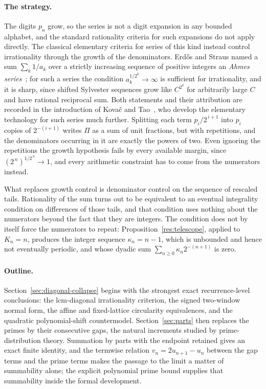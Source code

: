 \documentclass[11pt]{article}
\begin{document}
\paragraph{The strategy.}
The digits $p_n$ grow, so the series is not a digit expansion in any bounded
alphabet, and the standard rationality criteria for such expansions do not
apply directly.  The classical elementary criteria for series of this kind
instead control irrationality through the growth of the denominators.
Erd\H{o}s and Straus named a sum $\sum_k 1/a_k$ over a strictly increasing
sequence of positive integers an \emph{Ahmes series}~\cite{erdosstraus1963}; for
such a series the condition $a_k^{1/2^k}\to\infty$ is sufficient for
irrationality, and it is sharp, since shifted Sylvester sequences grow like
$C^{2^{k}}$ for arbitrarily large $C$ and have rational reciprocal sum.  Both
statements and their attribution are recorded in the introduction of Kova\v{c}
and Tao~\cite[\S1]{kovactao2024}, who develop the elementary technology for such
series much further.  Splitting each term $p_i/2^{\,i+1}$ into $p_i$ copies of
$2^{-(i+1)}$ writes $\Pi$ as a sum of unit fractions, but with repetitions, and
the denominators occurring in it are exactly the powers of two.  Even ignoring
the repetitions the growth hypothesis fails by every available margin, since
$(2^{\,n})^{1/2^{\,n}}\to1$, and every arithmetic constraint has to come from
the numerators instead.

What replaces growth control is denominator control on the sequence of
rescaled tails.  Rationality of the sum turns out to be equivalent to an
eventual integrality condition on differences of those tails, and that
condition uses nothing about the numerators beyond the fact that they are
integers.  The condition does not by itself force the numerators to repeat:
Proposition~\ref{res:telescope}, applied to $K_n=n$, produces the integer
sequence $\kappa_n=n-1$, which is unbounded and hence not eventually periodic,
and whose dyadic sum $\sum_{n\ge0}\kappa_n2^{-(n+1)}$ is zero.

\paragraph{Outline.}
Section~\ref{sec:diagonal-collapse} begins with the strongest exact
recurrence-level conclusions: the lcm-diagonal irrationality criterion, the
signed two-window normal form, the affine and fixed-lattice circularity
equivalences, and the quadratic polynomial-shift countermodel.
Section~\ref{sec:parts} then replaces the primes by their consecutive gaps, the
natural increments studied by prime-distribution theory.  Summation by parts
with the endpoint retained gives an exact finite identity, and the termwise
relation $v_n=2u_{n+1}-u_n$ between the gap terms and the prime terms makes the
passage to the limit a matter of summability alone; the explicit polynomial
prime bound supplies that summability inside the formal development.
\end{document}
